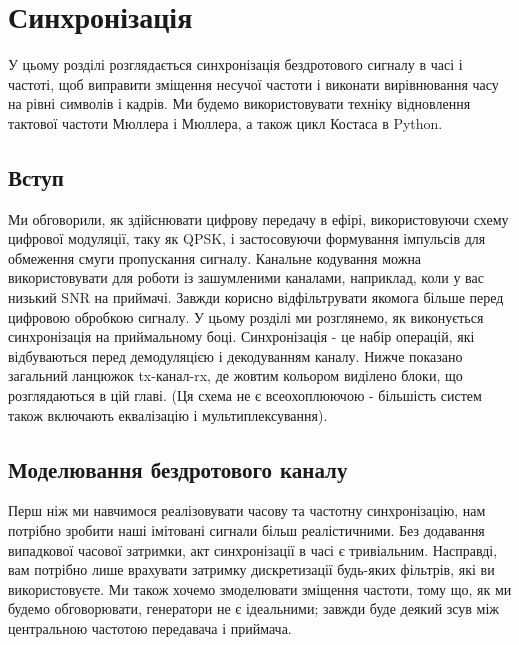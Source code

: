 \chapter{Синхронізація}\label{sync-chapter}

У цьому розділі розглядається синхронізація бездротового сигналу в часі
і частоті, щоб виправити зміщення несучої частоти і виконати
вирівнювання часу на рівні символів і кадрів. Ми будемо використовувати
техніку відновлення тактової частоти Мюллера і Мюллера, а також цикл
Костаса в Python.

\section{Вступ}\label{ux432ux441ux442ux443ux43f}

Ми обговорили, як здійснювати цифрову передачу в ефірі, використовуючи
схему цифрової модуляції, таку як QPSK, і застосовуючи формування
імпульсів для обмеження смуги пропускання сигналу. Канальне кодування
можна використовувати для роботи із зашумленими каналами, наприклад,
коли у вас низький SNR на приймачі. Завжди корисно відфільтрувати
якомога більше перед цифровою обробкою сигналу. У цьому розділі ми
розглянемо, як виконується синхронізація на приймальному боці.
Синхронізація - це набір операцій, які відбуваються перед демодуляцією і
декодуванням каналу. Нижче показано загальний ланцюжок tx-канал-rx, де
жовтим кольором виділено блоки, що розглядаються в цій главі. (Ця схема
не є всеохоплюючою - більшість систем також включають еквалізацію і
мультиплексування).

\href{../_images/sync-diagram.svg}{}

\section{Моделювання бездротового
каналу}\label{ux43cux43eux434ux435ux43bux44eux432ux430ux43dux43dux44f-ux431ux435ux437ux434ux440ux43eux442ux43eux432ux43eux433ux43e-ux43aux430ux43dux430ux43bux443}

Перш ніж ми навчимося реалізовувати часову та частотну синхронізацію,
нам потрібно зробити наші імітовані сигнали більш реалістичними. Без
додавання випадкової часової затримки, акт синхронізації в часі є
тривіальним. Насправді, вам потрібно лише врахувати затримку
дискретизації будь-яких фільтрів, які ви використовуєте. Ми також хочемо
змоделювати зміщення частоти, тому що, як ми будемо обговорювати,
генератори не є ідеальними; завжди буде деякий зсув між центральною
частотою передавача і приймача.

